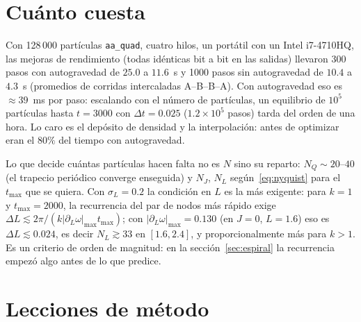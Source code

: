 \documentclass[11pt,a4paper]{article}
\begin{document}
\section{Cuánto cuesta}
\label{sec:costo}

Con 128\,000 partículas \texttt{aa\_quad}, cuatro hilos, un portátil con un Intel i7-4710HQ,
las mejoras de rendimiento (todas idénticas bit a bit en las salidas) llevaron 300 pasos
con autogravedad de $25.0$ a $11.6$~s y 1000 pasos sin autogravedad de $10.4$ a $4.3$~s
(promedios de corridas intercaladas A--B--B--A). Con autogravedad eso es
$\approx39$~ms por paso: escalando con el número de partículas, un equilibrio de $10^5$
partículas hasta $t=3000$ con $\Delta t=0.025$ ($1.2\times10^5$ pasos) tarda del orden de una
hora. Lo caro es el depósito de densidad y la interpolación: antes de optimizar eran el
$80\%$ del tiempo con autogravedad.

Lo que decide cuántas partículas hacen falta no es $N$ sino su reparto:
$N_Q\sim20$--$40$ (el trapecio periódico converge enseguida) y $N_J$, $N_L$
según~\eqref{eq:nyquist} para el $t_{\max}$ que se quiera. Con $\sigma_L=0.2$ la
condición en $L$ es la más exigente: para $k=1$ y $t_{\max}=2000$, la recurrencia del par de
nodos más rápido exige $\Delta L\lesssim2\pi/(k|\partial_L\omega|_{\max}t_{\max})$; con
$|\partial_L\omega|_{\max}=0.130$ (en $J=0$, $L=1.6$) eso es $\Delta L\lesssim0.024$, es decir
$N_L\gtrsim33$ en $[1.6,2.4]$, y proporcionalmente más para $k>1$. Es un criterio de orden
de magnitud: en la sección~\ref{sec:espiral} la recurrencia empezó algo antes de lo que
predice.

\section{Lecciones de método}
\end{document}
